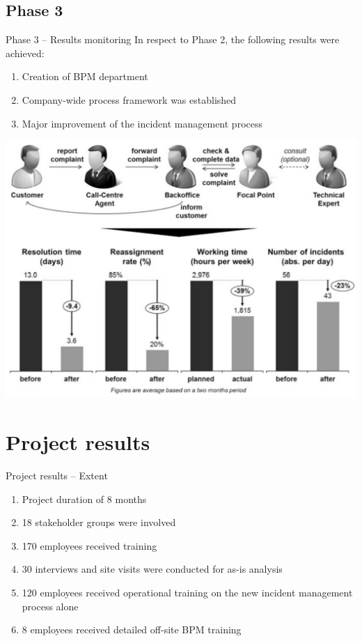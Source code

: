 \documentclass{beamer}
\begin{document}
\subsection{Phase 3}
\begin{frame}{Phase 3 -- Results monitoring}
    In respect to Phase 2, the following results were achieved:
    \begin{enumerate}
        \item Creation of BPM department
        \item Company-wide process framework was established
        \item Major improvement of the incident management process
    \end{enumerate}
\end{frame}

\begin{frame}
    \begin{center}
        \includegraphics[width=1.0\textwidth]{proj_phase3results.png}
    \end{center}
\end{frame}

\section{Project results}
\begin{frame}{Project results -- Extent}
    \begin{enumerate}[$\circ$]
        \item Project duration of 8 months
        \item 18 stakeholder groups were involved
        \item 170 employees received training
        \item 30 interviews and site visits were conducted for as-is analysis
        \item 120 employees received operational training on the new incident management process alone
        \item 8 employees received detailed off-site BPM training
    \end{enumerate}
\end{frame}
\end{document}
